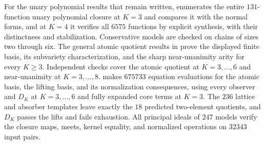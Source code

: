 For the unary polynomial results that remain written,  enumerates the entire $131$-function unary polynomial closure at $K=3$ and compares it with the normal forms, and at $K=4$ it verifies all $6575$ functions by explicit synthesis, with their distinctness and stabilization. Conservative models are checked on chains of sizes two through six. The general atomic quotient results in  prove the displayed finite basis, its subvariety characterization, and the sharp near-unanimity arity for every $K\geq3$. Independent checks cover the atomic quotient at $K=3,\ldots,6$ and near-unanimity at $K=3,\ldots,8$.  makes $675733$ equation evaluations for the atomic basis, the lifting basis, and its normalization consequences, using every observer and $D_K$ at $K=3,\ldots,6$ and fully expanded core terms at $K=3$. The $236$ lattice and absorber templates leave exactly the $18$ predicted two-element quotients, and $D_K$ passes the lifts and fails exhaustion. All principal ideals of $247$ models verify the closure maps, meets, kernel equality, and normalized operations on $32343$ input pairs.
